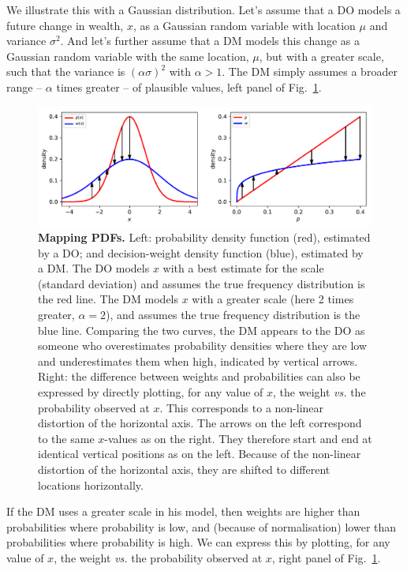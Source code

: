 \documentclass[a4paper, 12pt]{article}
\newcommand{\flabel}[1]{\label{fig:#1}}
\newcommand{\fref}[1]{Fig.~\ref{fig:#1}}
\newcommand{\vs}{\textit{vs.}\xspace}
\begin{document}
We illustrate this with a Gaussian distribution.
Let's assume that a DO models a future change in wealth, $x$, as a Gaussian random variable with location $\mu$ and variance $\sigma^2$. And let's further assume that a DM models this change as a Gaussian random variable with the same location, $\mu$, but with a greater scale, such that the variance is $(\alpha\sigma)^2$ with $\alpha>1$. The DM simply assumes a broader range -- $\alpha$ times greater -- of plausible values, left panel of \fref{mapping_pdfs}.
\begin{figure}[!htb]
\centering
\includegraphics[width=\textwidth]{./figs/mapping_pdfs.pdf}
\caption{\textbf{Mapping PDFs.} Left: probability density function (red), estimated by a DO; and decision-weight density function (blue), estimated by a DM. The DO models $x$ with a best estimate for the scale (standard deviation) and assumes the true frequency distribution is the red line. The DM models $x$ with a greater scale (here 2 times greater, $\alpha=2$), and assumes the true frequency distribution is the blue line. Comparing the two curves, the DM appears to the DO as someone who overestimates probability densities where they are low and underestimates them when high, indicated by vertical arrows.
Right: the difference between weights and probabilities can also be expressed by directly plotting, for any value of $x$, the weight \vs the probability observed at $x$. This corresponds to a non-linear distortion of the horizontal axis. The arrows on the left correspond to the same $x$-values as on the right. They therefore start and end at identical vertical positions as on the left. Because of the non-linear distortion of the horizontal axis, they are shifted to different locations horizontally.}
\flabel{mapping_pdfs}
\end{figure}

If the DM uses a greater scale in his model, then weights are higher than probabilities where probability is low, and (because of normalisation) lower than probabilities where probability is high. 
We can express this by plotting, for any value of $x$, the weight \vs the probability observed at $x$, right panel of \fref{mapping_pdfs}.
\end{document}
